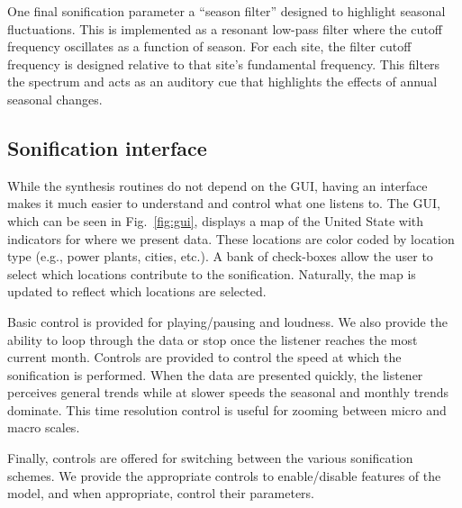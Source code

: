 \documentclass[a4paper,10pt,oneside]{article}
\newcommand{\ce}[1]{$\mathrm{#1}$}
\begin{document}
\begin{sloppy}
One final sonification parameter a ``season filter'' designed to highlight seasonal fluctuations. This is implemented as a resonant low-pass filter where the cutoff frequency oscillates as a function of season. For each site, the filter cutoff frequency is designed relative to that site's fundamental frequency.  This filters the spectrum and acts as an auditory cue that highlights the effects of annual seasonal changes. 






\subsection{Sonification interface}

While the synthesis routines do not depend on the GUI, having an interface makes it much easier to understand and control what one listens to. The GUI, which can be seen in Fig.~\ref{fig:gui}, displays a map of the United State with indicators for where we present data.  These locations are color coded by location type (e.g., power plants, cities, etc.). A bank of check-boxes allow the user to select which locations contribute to the sonification. Naturally, the map is updated to reflect which locations are selected.  


Basic control is provided for playing/pausing and loudness. We also provide the ability to loop through the data or stop once the listener reaches the most current month.  Controls are provided to control the speed at which the sonification is performed.  When the data are presented quickly, the listener perceives general trends while at slower speeds the seasonal and monthly trends dominate.  This time resolution control is useful for zooming between micro and macro scales.  

Finally, controls are offered for switching between the various sonification schemes. We provide the appropriate controls to enable/disable features of the model, and when appropriate, control their parameters.  


\end{sloppy}
\end{document}
